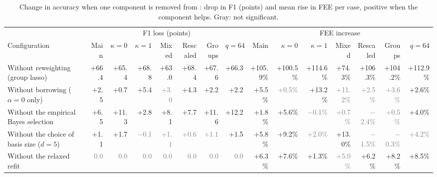 \begin{table}[t]
\caption{Change in accuracy when one component is removed from \sys{}: drop in F1 (points) and mean rise in FEE per case, positive when the component helps. Gray: not significant.}
\label{tab:attribution}
\centering
\footnotesize
\setlength{\tabcolsep}{2.4pt}
\begin{tabular*}{\textwidth}{@{\extracolsep{\fill}}lrrrrrrrrrrrrrr@{}}
\toprule
& \multicolumn{7}{c}{F1 loss (points)} & \multicolumn{7}{c}{FEE increase}\\
\cmidrule(lr){2-8}\cmidrule(lr){9-15}
Configuration & Main & $\kappa=0$ & $\kappa=1$ & Mixed & Rescaled & Groups & $q=64$ & Main & $\kappa=0$ & $\kappa=1$ & Mixed & Rescaled & Groups & $q=64$\\
\midrule
Without reweighting (group lasso) & +66.4 & +65.4 & +68.8 & +63.0 & +68.4 & +67.6 & +66.3 & +105.9\% & +100.5\% & +114.6\% & +74.3\% & +106.3\% & +104.2\% & +112.9\%\\
Without borrowing ($\alpha=0$ only) & +2.5 & +0.7 & +5.4 & \textcolor{gray}{+3.0} & +4.3 & +2.2 & +2.2 & +5.5\% & \textcolor{gray}{+0.5\%} & +13.2\% & \textcolor{gray}{+11.2\%} & \textcolor{gray}{+2.5\%} & \textcolor{gray}{+3.6\%} & +2.6\%\\
Without the empirical Bayes selection & +6.5 & +11.3 & +2.8 & +8.1 & +7.7 & +11.6 & +12.2 & +1.8\% & +5.6\% & \textcolor{gray}{$-$0.1\%} & \textcolor{gray}{+0.7\%} & \textcolor{gray}{$-$2.4\%} & \textcolor{gray}{+0.5\%} & +4.0\%\\
Without the choice of basis size ($d=5$) & +1.1 & +1.7 & \textcolor{gray}{$-$0.1} & \textcolor{gray}{+1.1} & \textcolor{gray}{+0.6} & \textcolor{gray}{+1.1} & +1.5 & +5.8\% & +9.2\% & \textcolor{gray}{+2.0\%} & +13.0\% & \textcolor{gray}{$-$1.5\%} & \textcolor{gray}{$-$0.3\%} & \textcolor{gray}{+4.2\%}\\
Without the relaxed refit & \textcolor{gray}{0.0} & \textcolor{gray}{0.0} & \textcolor{gray}{0.0} & \textcolor{gray}{0.0} & \textcolor{gray}{0.0} & \textcolor{gray}{0.0} & \textcolor{gray}{0.0} & +6.3\% & +7.6\% & +1.3\% & \textcolor{gray}{+5.0\%} & +6.2\% & +8.2\% & +8.5\%\\
\bottomrule
\end{tabular*}
\end{table}
